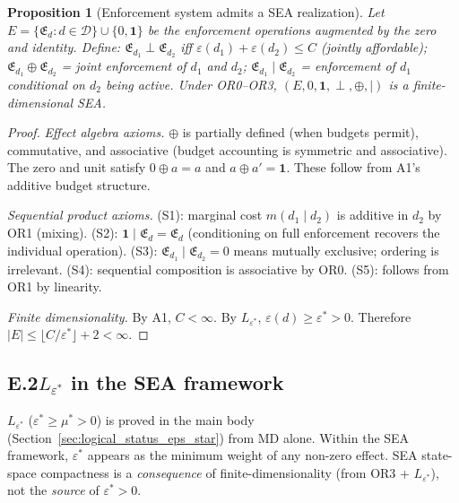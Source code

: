 \documentclass[11pt]{article}
\newtheorem{proposition}[theorem]{Proposition}
\theoremstyle{remark}
\begin{document}
\begin{proposition}[Enforcement system admits a SEA realization]
\label{prop:sea}
Let $E = \{\mathfrak{E}_d : d \in \mathcal{D}\} \cup \{0, \mathbf{1}\}$ be the enforcement operations augmented by the zero and identity.  Define:
$\mathfrak{E}_{d_1} \perp \mathfrak{E}_{d_2}$ iff $\varepsilon(d_1) + \varepsilon(d_2) \le C$ (jointly affordable);
$\mathfrak{E}_{d_1} \oplus \mathfrak{E}_{d_2}$ = joint enforcement of $d_1$ and $d_2$;
$\mathfrak{E}_{d_1} \mid \mathfrak{E}_{d_2}$ = enforcement of $d_1$ conditional on $d_2$ being active.
Under OR0--OR3, $(E, 0, \mathbf{1}, \perp, \oplus, \mid)$ is a finite-dimensional SEA.
\end{proposition}

\begin{proof}
\textit{Effect algebra axioms.}  $\oplus$ is partially defined (when budgets permit), commutative, and associative (budget accounting is symmetric and associative).  The zero and unit satisfy $0 \oplus a = a$ and $a \oplus a' = \mathbf{1}$.  These follow from A1's additive budget structure.

\textit{Sequential product axioms.}  (S1): marginal cost $m(d_1 \mid d_2)$ is additive in $d_2$ by OR1 (mixing).  (S2): $\mathbf{1} \mid \mathfrak{E}_d = \mathfrak{E}_d$ (conditioning on full enforcement recovers the individual operation).  (S3): $\mathfrak{E}_{d_1} \mid \mathfrak{E}_{d_2} = 0$ means mutually exclusive; ordering is irrelevant.  (S4): sequential composition is associative by OR0.  (S5): follows from OR1 by linearity.

\textit{Finite dimensionality.}  By A1, $C < \infty$.  By $L_{\varepsilon^*}$, $\varepsilon(d) \ge \varepsilon^* > 0$.  Therefore $|E| \le \lfloor C/\varepsilon^* \rfloor + 2 < \infty$.
\end{proof}

\subsection*{E.2\quad $L_{\varepsilon^*}$ in the SEA framework}

$L_{\varepsilon^*}$ ($\varepsilon^* \ge \mu^* > 0$) is proved in the main body (Section~\ref{sec:logical_status_eps_star}) from MD alone.  Within the SEA framework, $\varepsilon^*$ appears as the minimum weight of any non-zero effect.  SEA state-space compactness is a \emph{consequence} of finite-dimensionality (from OR3 + $L_{\varepsilon^*}$), not the \emph{source} of $\varepsilon^* > 0$.
\end{document}
